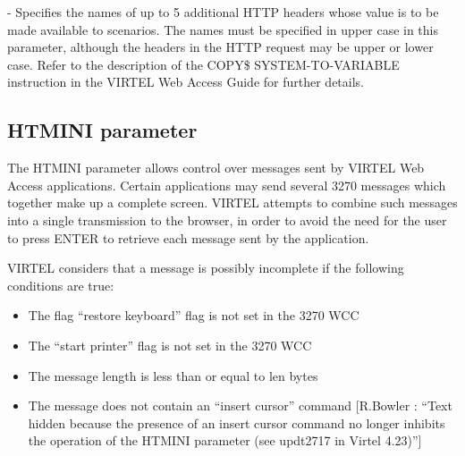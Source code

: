 \documentclass[letterpaper,10pt,english]{sphinxmanual}
\begin{document}
 - Specifies the names of up to 5 additional HTTP headers whose value is to be made available to scenarios. The names must be specified in upper case in this parameter, although the headers in the HTTP request may be upper or lower case. Refer to the description of the COPY\$ SYSTEM-TO-VARIABLE instruction in the VIRTEL Web Access Guide for further details.

\ignorespaces 

\subsection{HTMINI parameter}
\label{\detokenize{Installation_Guide:htmini-parameter}}\label{\detokenize{Installation_Guide:index-78}}
\begin{sphinxVerbatim}[commandchars=\\\{\}]
                  
\end{sphinxVerbatim}

The HTMINI parameter allows control over messages sent by VIRTEL Web Access applications. Certain applications may send several 3270 messages which together make up a complete screen. VIRTEL attempts to combine such messages into a single transmission to the browser, in order to avoid the need for the user to press ENTER to retrieve each message sent by the application.

VIRTEL considers that a message is possibly incomplete if the following conditions are true:
\begin{itemize}
\item {} 
The flag “restore keyboard” flag is not set in the 3270 WCC

\item {} 
The “start printer” flag is not set in the 3270 WCC

\item {} 
The message length is less than or equal to len bytes

\item {} 
The message does not contain an “insert cursor” command {[}R.Bowler : “Text hidden because the presence of an insert cursor command no longer inhibits the operation of the HTMINI parameter (see updt2717 in Virtel 4.23)”{]}

\end{itemize}
\end{document}
